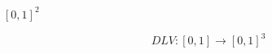 \documentclass{article}
\begin{document}
$[0,1]^2$
\pagebreak

\[ DLV: [0,1] \rightarrow [0,1]^3 \]
\pagebreak
\end{document}
